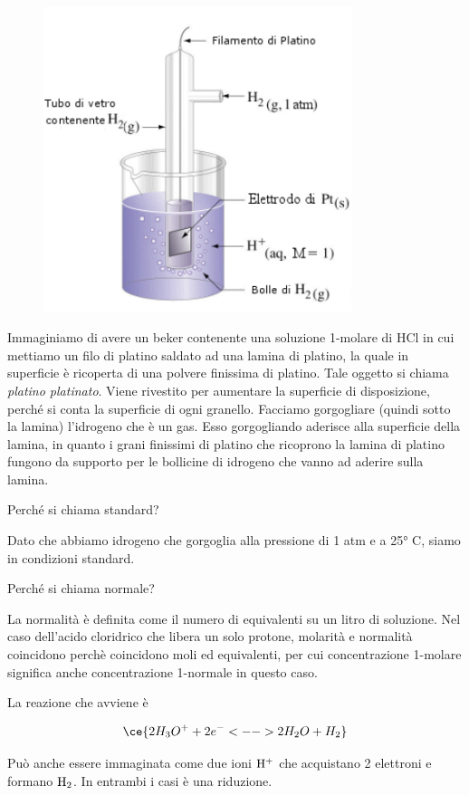 \begin{figure}[H]
    \centering
    \includegraphics[width=9cm]{immagini/Elettrodo_a_idrogeno.png}
\end{figure}

Immaginiamo di avere un beker contenente una soluzione 1-molare di HCl in cui mettiamo un filo di platino saldato ad una lamina di platino, la quale in superficie è ricoperta di una polvere finissima di platino. Tale oggetto si chiama \textit{platino platinato}. Viene rivestito per aumentare la superficie di disposizione, perché si conta la superficie di ogni granello. Facciamo gorgogliare (quindi sotto la lamina) l'idrogeno che è un gas. Esso gorgogliando aderisce alla superficie della lamina, in quanto i grani finissimi di platino che ricoprono la lamina di platino fungono da supporto per le bollicine di idrogeno che vanno ad aderire sulla lamina.

\vspace{0.2cm}Perché si chiama standard?

Dato che abbiamo idrogeno che gorgoglia alla pressione di 1 atm e a 25° C, siamo in condizioni standard.

Perché si chiama normale?

La normalità è definita come il numero di equivalenti su un litro di soluzione. Nel caso dell'acido cloridrico che libera un solo protone, molarità e normalità coincidono perchè coincidono moli ed equivalenti, per cui concentrazione 1-molare significa anche concentrazione 1-normale in questo caso.

La reazione che avviene è

$$\ce{2H_3O^+ + 2e^- <--> 2H_2O + H_2}$$

Può anche essere immaginata come due ioni $\rm H^+$ che acquistano 2 elettroni e formano $\rm H_2$. In entrambi i casi è una riduzione.

